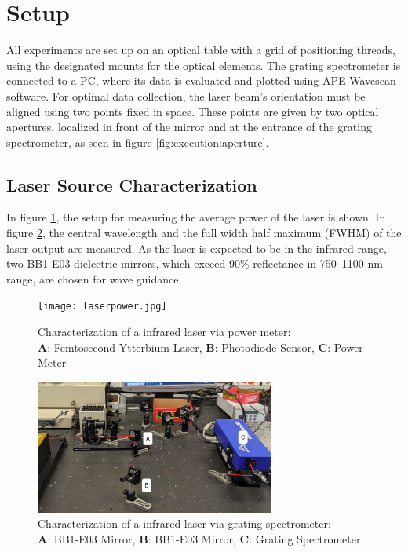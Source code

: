 \section{Setup}
\label{sec:setup}
All experiments are set up on an optical table with a grid of positioning threads, using the designated mounts for the optical elements.
The grating spectrometer is connected to a PC, where its data is evaluated and plotted using APE Wavescan software. 
For optimal data collection, the laser beam's orientation must be aligned using two points fixed in space.
These points are given by two optical apertures, localized in front of the mirror and at the entrance of the grating spectrometer, as seen in figure \ref{fig:execution:aperture}.


\subsection{Laser Source Characterization}
\noindent In figure \ref{fig:setup:power}, the setup for measuring the average power of the laser is shown.
In figure \ref{fig:setup:basic}, the central wavelength and the full width half maximum (FWHM) of the laser output are measured.
As the laser is expected to be in the infrared range, two BB1-E03 dielectric mirrors, which exceed 90\% reflectance in 750–1100 nm range, are chosen for wave guidance.



\begin{figure}[H]
    \centering
    \captionsetup{margin=3cm}
    \texttt{[image: laserpower.jpg]}
    \caption{
        Characterization of a infrared laser via power meter: \\
        \textbf{A}: Femtosecond Ytterbium Laser, 
        \textbf{B}: Photodiode Sensor,
        \textbf{C}: Power Meter
    }
    \label{fig:setup:power}
\end{figure}
\begin{figure}[H]
    \centering
    \captionsetup{margin=3cm}
    \includegraphics[width=0.7\textwidth]{graphics/basic-setup1.jpg}
    \caption{
        Characterization of a infrared laser via grating spectrometer: \\
        \textbf{A}: BB1-E03 Mirror,
        \textbf{B}: BB1-E03 Mirror,
        \textbf{C}: Grating Spectrometer
        }
        \label{fig:setup:basic}
    \end{figure}
    
